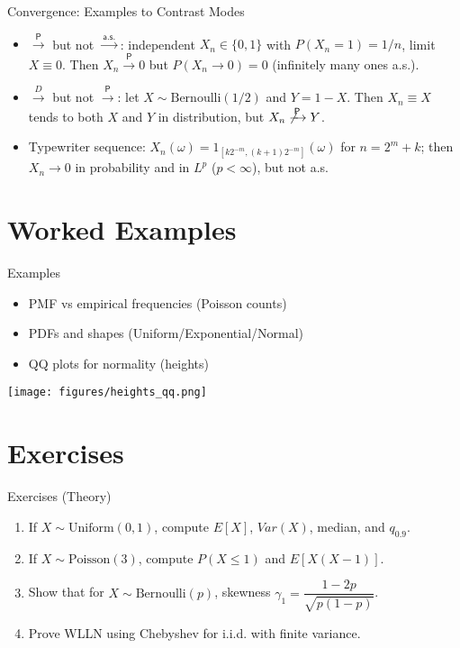 \documentclass[aspectratio=43]{beamer}
\def\P{P}%
\def\E{E}%
\def\Var{Var}%
\def\1{1}%
\def\mathbb#1{#1}%
\def\mathcal#1{#1}%
\renewcommand{\P}{\mathbb{P}}
\newcommand{\E}{\mathbb{E}}
\newcommand{\Var}{\operatorname{Var}}
\newcommand{\1}{\mathbf{1}}
\newcommand{\toP}{\xrightarrow{\,\mathsf{P}\,}}
\newcommand{\toas}{\xrightarrow{\,\mathsf{a.s.}\,}}
\newcommand{\tod}{\xrightarrow{\,\mathcal{D}\,}}
\begin{document}
\begin{frame}{Convergence: Examples to Contrast Modes}{}
  {\footnotesize
  \begin{itemize}
    \item $\toP$ but not $\toas$: independent $X_n\in\{0,1\}$ with $\P(X_n=1)=1/n$, limit $X\equiv 0$. Then $X_n\toP 0$ but $\P(X_n\to 0)=0$ (infinitely many ones a.s.).
    \item $\tod$ but not $\toP$: let $X\sim \mathrm{Bernoulli}(1/2)$ and $Y=1-X$. Then $X_n\equiv X$ tends to both $X$ and $Y$ in distribution, but $X_n\not\toP Y$.
    \item Typewriter sequence: $X_n(\omega)=\1_{[k2^{-m},(k+1)2^{-m}]}(\omega)$ for $n=2^m+k$; then $X_n\to 0$ in probability and in $L^p$ ($p<\infty$), but not a.s.
  \end{itemize}}
\end{frame}

\section{Worked Examples}

\begin{frame}{Examples}
  \begin{itemize}
    \item PMF vs empirical frequencies (Poisson counts)
    \item PDFs and shapes (Uniform/Exponential/Normal)
    \item QQ plots for normality (heights)
  \end{itemize}
  \begin{center}
    \texttt{[image: figures/heights\_qq.png]}
  \end{center}
\end{frame}

\section{Exercises}

\begin{frame}{Exercises (Theory)}
  \begin{enumerate}
    \item If $X\sim \mathrm{Uniform}(0,1)$, compute $\E[X]$, $\Var(X)$, median, and $q_{0.9}$.
    \item If $X\sim \mathrm{Poisson}(3)$, compute $\P(X\le 1)$ and $\E[X(X-1)]$.
    \item Show that for $X\sim \mathrm{Bernoulli}(p)$, skewness $\gamma_1 = \dfrac{1-2p}{\sqrt{p(1-p)}}$.
    \item Prove WLLN using Chebyshev for i.i.d. with finite variance.
  \end{enumerate}
\end{frame}
\end{document}
